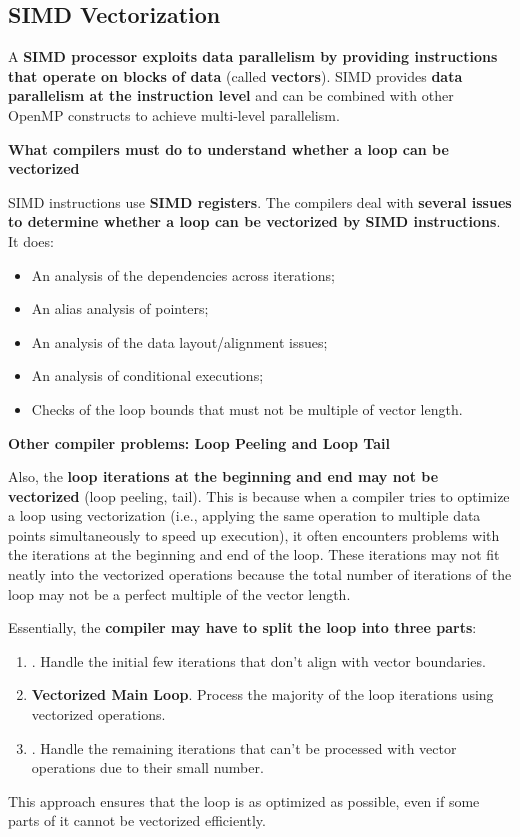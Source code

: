 \subsection{SIMD Vectorization}

A \textbf{SIMD processor exploits data parallelism by providing instructions that operate on blocks of data} (called \textbf{vectors}). SIMD provides \textbf{data parallelism at the instruction level} and can be combined with other OpenMP constructs to achieve multi-level parallelism.

\highspace
\begin{flushleft}
    \textcolor{Red2}{ \textbf{What compilers must do to understand whether a loop can be vectorized}}
\end{flushleft}
SIMD instructions use \textbf{SIMD registers}. The compilers deal with \textbf{several issues to determine whether a loop can be vectorized by SIMD instructions}. It does:
\begin{itemize}
    \item An analysis of the dependencies across iterations;
    \item An alias analysis of pointers;
    \item An analysis of the data layout/alignment issues;
    \item An analysis of conditional executions;
    \item Checks of the loop bounds that must not be multiple of vector length.
\end{itemize}

\highspace
\begin{flushleft}
    \textcolor{Red2}{ \textbf{Other compiler problems: Loop Peeling and Loop Tail}}
\end{flushleft}
Also, the \textbf{loop iterations at the beginning and end may not be vectorized} (loop peeling, tail). This is because when a compiler tries to optimize a loop using vectorization (i.e., applying the same operation to multiple data points simultaneously to speed up execution), it often encounters problems with the iterations at the beginning and end of the loop. These iterations may not fit neatly into the vectorized operations because the total number of iterations of the loop may not be a perfect multiple of the vector length.

\highspace
Essentially, the \textbf{compiler may have to split the loop into three parts}:
\begin{enumerate}
    \item {}. Handle the initial few iterations that don't align with vector boundaries.

    \item \textbf{Vectorized Main Loop}. Process the majority of the loop iterations using vectorized operations.

    \item {}. Handle the remaining iterations that can't be processed with vector operations due to their small number.
\end{enumerate}
This approach ensures that the loop is as optimized as possible, even if some parts of it cannot be vectorized efficiently.

